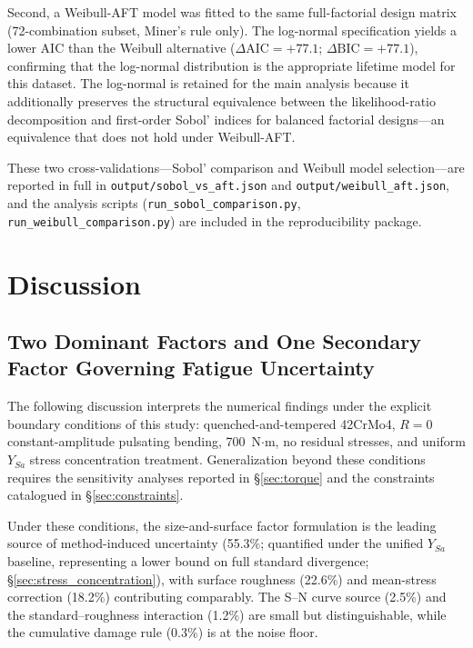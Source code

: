 \documentclass[twocolumn,12pt,a4paper]{article}
\begin{document}
Second, a Weibull-AFT model was fitted to the same full-factorial
design matrix (72-combination subset, Miner's rule only). The
log-normal specification yields a lower AIC than the Weibull
alternative ($\Delta\mathrm{AIC} = +77.1$; $\Delta\mathrm{BIC} =
+77.1$), confirming that the log-normal distribution is the
appropriate lifetime model for this dataset. The log-normal is
retained for the main analysis because it additionally preserves the
structural equivalence between the likelihood-ratio decomposition and
first-order Sobol' indices for balanced factorial designs---an
equivalence that does not hold under Weibull-AFT.

These two cross-validations---Sobol' comparison and Weibull model
selection---are reported in full in \texttt{output/sobol\_vs\_aft.json}
and \texttt{output/weibull\_aft.json}, and the analysis scripts
(\texttt{run\_sobol\_comparison.py}, \texttt{run\_weibull\_comparison.py})
are included in the reproducibility package.

\section{Discussion}
\label{sec:discussion}

\subsection{Two Dominant Factors and One Secondary Factor Governing Fatigue Uncertainty}

The following discussion interprets the numerical findings under the
explicit boundary conditions of this study: quenched-and-tempered
42CrMo4, $R=0$ constant-amplitude pulsating bending, 700~N$\cdot$m,
no residual stresses, and uniform $Y_{Sa}$ stress concentration
treatment. Generalization beyond these conditions requires the
sensitivity analyses reported in \S\ref{sec:torque} and the
constraints catalogued in \S\ref{sec:constraints}.

Under these conditions, the size-and-surface factor formulation is
the leading source of method-induced uncertainty (55.3\%; quantified %
under the unified $Y_{Sa}$ baseline, representing a lower bound on
full standard divergence; \S\ref{sec:stress_concentration}), with
surface roughness (22.6\%) and mean-stress correction (18.2\%)
contributing comparably. The S--N curve source (2.5\%) and the
standard--roughness interaction (1.2\%) are small but distinguishable,
while the cumulative damage rule (0.3\%) is at the noise floor.
\end{document}
